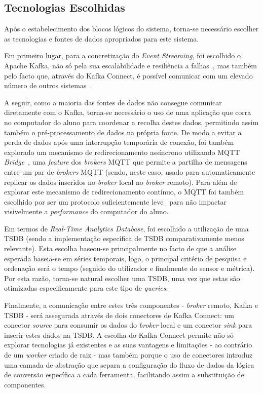 \subsection{Tecnologias Escolhidas}
\label{sec:chosen_technologies}

Após o estabelecimento dos blocos lógicos do sistema, torna-se necessário escolher as tecnologias e fontes de dados apropriados para este sistema.

Em primeiro lugar, para a concretização do \textit{Event Streaming}, foi escolhido o Apache Kafka, não só pela sua escalabilidade e resiliência a falhas~\cite{Kafka2011}, mas também pelo facto que, através do Kafka Connect, é possível comunicar com um elevado número de outros sistemas~\cite{kafka_connect_docs}.

A seguir, como a maioria das fontes de dados não consegue comunicar diretamente com o Kafka, torna-se necessário o uso de uma aplicação que corra no computador do aluno para coordenar a recolha destes dados, permitindo assim também o pré-processamento de dados na própria fonte.
De modo a evitar a perda de dados após uma interrupção temporária de conexão, foi também explorado um mecanismo de redirecionamento assíncrono utilizando \ac{MQTT} \textit{Bridge}~\cite{Cope2024}, uma \textit{feature} dos \textit{brokers} \ac{MQTT} que permite a partilha de mensagens entre um par de \textit{brokers} \ac{MQTT} (sendo, neste caso, usado para automaticamente replicar os dados inseridos no \textit{broker} local no \textit{broker} remoto).
Para além de explorar este mecanismo de redirecionamento contínuo, o \ac{MQTT} foi também escolhido por ser um protocolo suficientemente leve~\cite{amqp_mqtt_definitions} para não impactar visivelmente a \textit{performance} do computador do aluno.

Em termos de \textit{Real-Time Analytics Database}, foi escolhido a utilização de uma \ac{TSDB} (sendo a implementação específica de \ac{TSDB} comparativamente menos relevante).
Esta escolha baseou-se principalmente no facto de que a análise esperada baseia-se em séries temporais, logo, o principal critério de pesquisa e ordenação será o tempo (seguido do utilizador e finalmente do sensor e métrica).
Por esta razão, torna-se natural escolher uma \ac{TSDB}, uma vez que estas são otimizadas especificamente para este tipo de \textit{queries}.

Finalmente, a comunicação entre estes três componentes - \textit{broker} remoto, Kafka e \ac{TSDB} - será assegurada através de dois conectores de Kafka Connect: um conector \textit{source} para consumir os dados do \textit{broker} local e um conector \textit{sink} para inserir estes dados na \ac{TSDB}.
A escolha do Kafka Connect permite não só explorar tecnologias já existentes e as suas vantagens e limitações - ao contrário de um \textit{worker} criado de raiz - mas também porque o uso de conectores introduz uma camada de abstração que separa a configuração do fluxo de dados da lógica de conversão específica a cada ferramenta, facilitando assim a substituição de componentes.

